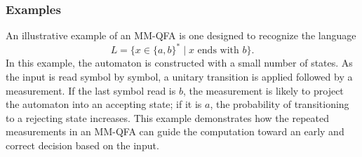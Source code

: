 \subsubsection{Examples}
An illustrative example of an MM-QFA is one designed to recognize the language 
\[
L = \{x \in \{a,b\}^* \mid x \text{ ends with } b\}.
\]
In this example, the automaton is constructed with a small number of states. As the input is read symbol by symbol, a unitary transition is applied followed by a measurement. If the last symbol read is $b$, the measurement is likely to project the automaton into an accepting state; if it is $a$, the probability of transitioning to a rejecting state increases. This example demonstrates how the repeated measurements in an MM-QFA can guide the computation toward an early and correct decision based on the input.
